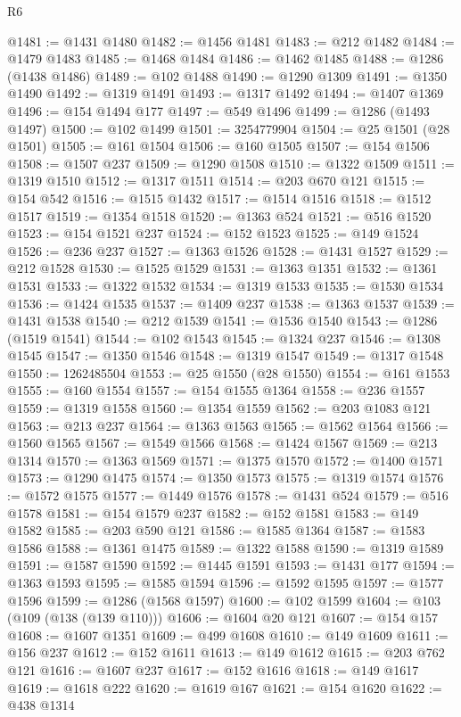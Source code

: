\begin{lexlean}{R6}
\begin{coremodule}
@1481 := @1431 @1480
@1482 := @1456 @1481
@1483 := @212 @1482
@1484 := @1479 @1483
@1485 := @1468 @1484
@1486 := @1462 @1485
@1488 := @1286 (@1438 @1486)
@1489 := @102 @1488
@1490 := @1290 @1309
@1491 := @1350 @1490
@1492 := @1319 @1491
@1493 := @1317 @1492
@1494 := @1407 @1369
@1496 := @154 @1494 @177
@1497 := @549 @1496
@1499 := @1286 (@1493 @1497)
@1500 := @102 @1499
@1501 := 3254779904
@1504 := @25 @1501 (@28 @1501)
@1505 := @161 @1504
@1506 := @160 @1505
@1507 := @154 @1506
@1508 := @1507 @237
@1509 := @1290 @1508
@1510 := @1322 @1509
@1511 := @1319 @1510
@1512 := @1317 @1511
@1514 := @203 @670 @121
@1515 := @154 @542
@1516 := @1515 @1432
@1517 := @1514 @1516
@1518 := @1512 @1517
@1519 := @1354 @1518
@1520 := @1363 @524
@1521 := @516 @1520
@1523 := @154 @1521 @237
@1524 := @152 @1523
@1525 := @149 @1524
@1526 := @236 @237
@1527 := @1363 @1526
@1528 := @1431 @1527
@1529 := @212 @1528
@1530 := @1525 @1529
@1531 := @1363 @1351
@1532 := @1361 @1531
@1533 := @1322 @1532
@1534 := @1319 @1533
@1535 := @1530 @1534
@1536 := @1424 @1535
@1537 := @1409 @237
@1538 := @1363 @1537
@1539 := @1431 @1538
@1540 := @212 @1539
@1541 := @1536 @1540
@1543 := @1286 (@1519 @1541)
@1544 := @102 @1543
@1545 := @1324 @237
@1546 := @1308 @1545
@1547 := @1350 @1546
@1548 := @1319 @1547
@1549 := @1317 @1548
@1550 := 1262485504
@1553 := @25 @1550 (@28 @1550)
@1554 := @161 @1553
@1555 := @160 @1554
@1557 := @154 @1555 @1364
@1558 := @236 @1557
@1559 := @1319 @1558
@1560 := @1354 @1559
@1562 := @203 @1083 @121
@1563 := @213 @237
@1564 := @1363 @1563
@1565 := @1562 @1564
@1566 := @1560 @1565
@1567 := @1549 @1566
@1568 := @1424 @1567
@1569 := @213 @1314
@1570 := @1363 @1569
@1571 := @1375 @1570
@1572 := @1400 @1571
@1573 := @1290 @1475
@1574 := @1350 @1573
@1575 := @1319 @1574
@1576 := @1572 @1575
@1577 := @1449 @1576
@1578 := @1431 @524
@1579 := @516 @1578
@1581 := @154 @1579 @237
@1582 := @152 @1581
@1583 := @149 @1582
@1585 := @203 @590 @121
@1586 := @1585 @1364
@1587 := @1583 @1586
@1588 := @1361 @1475
@1589 := @1322 @1588
@1590 := @1319 @1589
@1591 := @1587 @1590
@1592 := @1445 @1591
@1593 := @1431 @177
@1594 := @1363 @1593
@1595 := @1585 @1594
@1596 := @1592 @1595
@1597 := @1577 @1596
@1599 := @1286 (@1568 @1597)
@1600 := @102 @1599
@1604 := @103 (@109 (@138 (@139 @110)))
@1606 := @1604 @20 @121
@1607 := @154 @157
@1608 := @1607 @1351
@1609 := @499 @1608
@1610 := @149 @1609
@1611 := @156 @237
@1612 := @152 @1611
@1613 := @149 @1612
@1615 := @203 @762 @121
@1616 := @1607 @237
@1617 := @152 @1616
@1618 := @149 @1617
@1619 := @1618 @222
@1620 := @1619 @167
@1621 := @154 @1620
@1622 := @438 @1314

\end{coremodule}
\end{lexlean}

